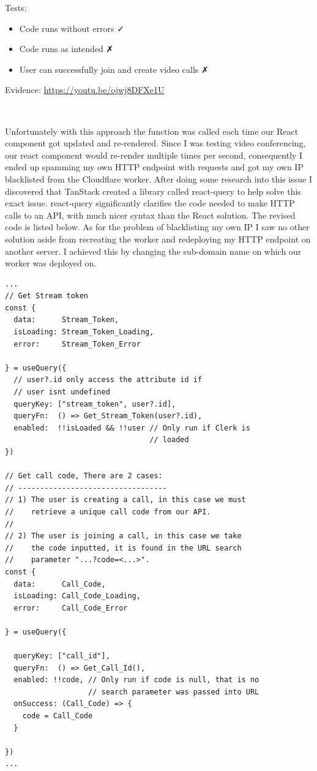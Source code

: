{\sffamily Tests:}

\begin{itemize}
  \item Code runs without errors \faCheck \\
  \item Code runs as intended \faClose \\
  \item User can successfully join and create video calls \faClose \\
\end{itemize}

{\sffamily Evidence:} \url{https://youtu.be/ojwj8DFXe1U}

{\color{gray} \hrulefill} \\ \vspace{0.2cm}

Unfortunately with this approach the 
function was called each time our React component got updated and 
re-rendered. Since I was testing video conferencing, our react 
component would re-render multiple times per second, consequently 
I ended up spamming my own HTTP endpoint with requests and got 
my own IP blacklisted from the Cloudflare worker. After doing 
some research into this issue I discovered that TanStack
created a library called react-query to help solve this 
exact issue. react-query significantly clarifies the code 
needed to make HTTP calls to an API, with much nicer syntax
than the React  solution. The revised code is 
listed below. As for the problem of blacklisting my own IP I 
saw no other solution aside from recreating the worker and 
redeploying my HTTP endpoint on another server. I achieved this
by changing the sub-domain name on which our worker was
deployed on.

\begin{verbatim}
...
// Get Stream token
const {
  data:      Stream_Token, 
  isLoading: Stream_Token_Loading,
  error:     Stream_Token_Error

} = useQuery({
  // user?.id only access the attribute id if
  // user isnt undefined
  queryKey: ["stream_token", user?.id], 
  queryFn:  () => Get_Stream_Token(user?.id),
  enabled:  !!isLoaded && !!user // Only run if Clerk is
                                 // loaded
})

// Get call code, There are 2 cases:
// ----------------------------------
// 1) The user is creating a call, in this case we must 
//    retrieve a unique call code from our API.
//
// 2) The user is joining a call, in this case we take 
//    the code inputted, it is found in the URL search 
//    parameter "...?code=<...>".
const {
  data:      Call_Code,
  isLoading: Call_Code_Loading,
  error:     Call_Code_Error

} = useQuery({

  queryKey: ["call_id"],
  queryFn:  () => Get_Call_Id(),
  enabled: !!code, // Only run if code is null, that is no
                   // search parameter was passed into URL
  onSuccess: (Call_Code) => {
    code = Call_Code
  }

})
...
\end{verbatim}
